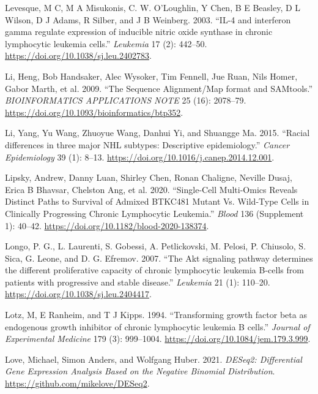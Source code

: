 \documentclass[11pt, a4paper, twosided]{book}
\newenvironment{CSLReferences}%
  {}%
  {\par}
\begin{document}
\begin{CSLReferences}{1}{0}
\leavevmode{}%
Levesque, M C, M A Misukonis, C. W. O'Loughlin, Y Chen, B E Beasley, D L Wilson, D J Adams, R Silber, and J B Weinberg. 2003. {``{IL-4 and interferon gamma regulate expression of inducible nitric oxide synthase in chronic lymphocytic leukemia cells}.''} \emph{Leukemia} 17 (2): 442--50. \url{https://doi.org/10.1038/sj.leu.2402783}.

\leavevmode{}%
Li, Heng, Bob Handsaker, Alec Wysoker, Tim Fennell, Jue Ruan, Nils Homer, Gabor Marth, et al. 2009. {``{The Sequence Alignment/Map format and SAMtools}.''} \emph{BIOINFORMATICS APPLICATIONS NOTE} 25 (16): 2078--79. \url{https://doi.org/10.1093/bioinformatics/btp352}.

\leavevmode{}%
Li, Yang, Yu Wang, Zhuoyue Wang, Danhui Yi, and Shuangge Ma. 2015. {``{Racial differences in three major NHL subtypes: Descriptive epidemiology}.''} \emph{Cancer Epidemiology} 39 (1): 8--13. \url{https://doi.org/10.1016/j.canep.2014.12.001}.

\leavevmode{}%
Lipsky, Andrew, Danny Luan, Shirley Chen, Ronan Chaligne, Neville Dusaj, Erica B Bhavsar, Chelston Ang, et al. 2020. {``{Single-Cell Multi-Omics Reveals Distinct Paths to Survival of Admixed BTKC481 Mutant Vs. Wild-Type Cells in Clinically Progressing Chronic Lymphocytic Leukemia}.''} \emph{Blood} 136 (Supplement 1): 40--42. \url{https://doi.org/10.1182/blood-2020-138374}.

\leavevmode{}%
Longo, P. G., L. Laurenti, S. Gobessi, A. Petlickovski, M. Pelosi, P. Chiusolo, S. Sica, G. Leone, and D. G. Efremov. 2007. {``{The Akt signaling pathway determines the different proliferative capacity of chronic lymphocytic leukemia B-cells from patients with progressive and stable disease}.''} \emph{Leukemia} 21 (1): 110--20. \url{https://doi.org/10.1038/sj.leu.2404417}.

\leavevmode{}%
Lotz, M, E Ranheim, and T J Kipps. 1994. {``{Transforming growth factor beta as endogenous growth inhibitor of chronic lymphocytic leukemia B cells.}''} \emph{Journal of Experimental Medicine} 179 (3): 999--1004. \url{https://doi.org/10.1084/jem.179.3.999}.

\leavevmode{}%
Love, Michael, Simon Anders, and Wolfgang Huber. 2021. \emph{DESeq2: Differential Gene Expression Analysis Based on the Negative Binomial Distribution}. \url{https://github.com/mikelove/DESeq2}.


\end{CSLReferences}
\end{document}
